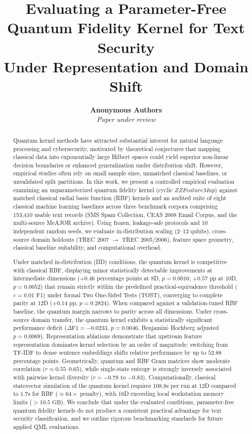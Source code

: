 \documentclass[10pt,twocolumn,letterpaper]{article}
\title{\textbf{Evaluating a Parameter-Free Quantum Fidelity Kernel for Text Security\\Under Representation and Domain Shift}}
\author{
  \textbf{Anonymous Authors} \\
  \textit{Paper under review}
}
\date{}
\begin{document}
\maketitle

\begin{abstract}
Quantum kernel methods have attracted substantial interest for natural language processing and cybersecurity, motivated by theoretical conjectures that mapping classical data into exponentially large Hilbert spaces could yield superior non-linear decision boundaries or enhanced generalization under distribution shift. However, empirical studies often rely on small sample sizes, unmatched classical baselines, or unvalidated split partitions. In this work, we present a controlled empirical evaluation examining an unparameterized quantum fidelity kernel (cyclic $ZZFeatureMap$) against matched classical radial basis function (RBF) kernels and an audited suite of eight classical machine learning baselines across three benchmark corpora comprising 153,410 usable text records (SMS Spam Collection, CEAS 2008 Email Corpus, and the multi-source MeAJOR archive). Using frozen, leakage-safe protocols and 10 independent random seeds, we evaluate in-distribution scaling ($2\text{--}12$ qubits), cross-source domain holdouts (TREC 2007 $\to$ TREC 2005/2006), feature space geometry, classical baseline suitability, and computational overhead.

Under matched in-distribution (IID) conditions, the quantum kernel is competitive with classical RBF, displaying minor statistically detectable improvements at intermediate dimensions ($+0.46$ percentage points at 8D, $p = 0.0016$; $+0.57$ pp at 10D, $p = 0.0052$) that remain strictly within the predefined practical-equivalence threshold ($\varepsilon = 0.01$ F1) under formal Two One-Sided Tests (TOST), converging to complete parity at 12D ($+0.14$ pp, $p = 0.2824$). When compared against a validation-tuned RBF baseline, the quantum margin narrows to parity across all dimensions. Under cross-source domain transfer, the quantum kernel exhibits a statistically significant performance deficit ($\Delta\text{F1} = -0.0233$, $p = 0.0046$, Benjamini--Hochberg adjusted $p = 0.0069$). Representation ablations demonstrate that upstream feature representation dominates kernel selection by an order of magnitude: switching from TF-IDF to dense sentence embeddings shifts relative performance by up to $52.88$ percentage points. Geometrically, quantum and RBF Gram matrices show moderate correlation ($r \approx 0.55\text{--}0.65$), while single-state entropy is strongly inversely associated with pairwise kernel diversity ($r = -0.78$ to $-0.83$). Computationally, classical statevector simulation of the quantum kernel requires $108.8\text{s}$ per run at 12D compared to $1.7\text{s}$ for RBF ($\approx 64\times$ penalty), with 16D exceeding local workstation memory limits ($>10.5\text{ GB}$). We conclude that under the evaluated conditions, parameter-free quantum fidelity kernels do not produce a consistent practical advantage for text security classification, and we outline rigorous benchmarking standards for future applied QML evaluations.
\end{abstract}
\end{document}
